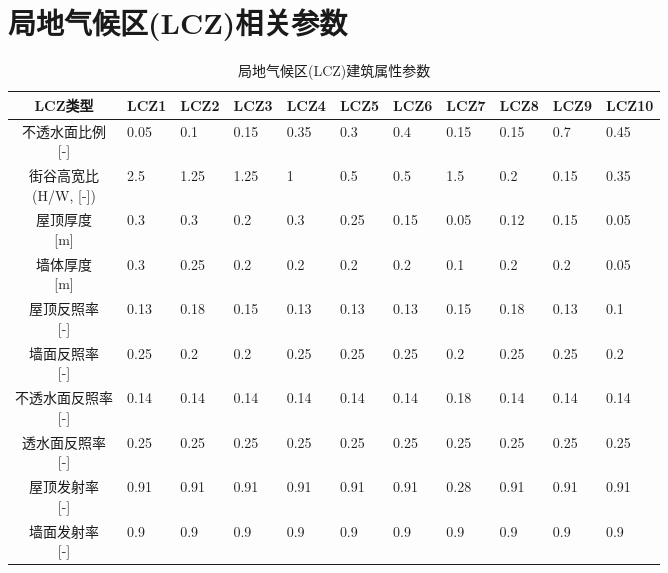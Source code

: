 \chapter{局地气候区(LCZ)相关参数}\label{局地气候区(LCZ)建筑属性参数}
\begin{landscape}
\begin{table}[htbp]
    \footnotesize
	\centering
	\caption{局地气候区(LCZ)建筑属性参数}
	\label{tab:lcz局地气候区建筑属性参数}
    \begin{tabular}{@{}cllllllllll@{}}
    \toprule
    LCZ类型       & LCZ1 & LCZ2 & LCZ3 & LCZ4 & LCZ5 & LCZ6 & LCZ7 & LCZ8 & LCZ9 & LCZ10 \\ \midrule
    \makecell{不透水面比例\\{[-]}}   & 0.05 & 0.1  & 0.15 & 0.35 & 0.3  & 0.4  & 0.15 & 0.15 & 0.7  & 0.45 \\
    \makecell{街谷高宽比\\(H/W, [-])}& 2.5  & 1.25 & 1.25 & 1    & 0.5  & 0.5  & 1.5  & 0.2  & 0.15 & 0.35 \\
    \makecell{屋顶厚度\\{[m]}}      & 0.3  & 0.3  & 0.2  & 0.3  & 0.25 & 0.15 & 0.05 & 0.12 & 0.15 & 0.05 \\
    \makecell{墙体厚度\\{[m]}}     & 0.3  & 0.25 & 0.2  & 0.2  & 0.2  & 0.2  & 0.1  & 0.2  & 0.2  & 0.05 \\
    \makecell{屋顶反照率\\{[-]}}    & 0.13 & 0.18 & 0.15 & 0.13 & 0.13 & 0.13 & 0.15 & 0.18 & 0.13 & 0.1  \\
    \makecell{墙面反照率\\{[-]}}    & 0.25 & 0.2  & 0.2  & 0.25 & 0.25 & 0.25 & 0.2  & 0.25 & 0.25 & 0.2  \\
    \makecell{不透水面反照率\\{[-]}}& 0.14 & 0.14 & 0.14 & 0.14 & 0.14 & 0.14 & 0.18 & 0.14 & 0.14 & 0.14 \\
    \makecell{透水面反照率\\{[-]}}& 0.25 & 0.25 & 0.25 & 0.25 & 0.25 & 0.25 & 0.25 & 0.25 & 0.25 & 0.25 \\
    \makecell{屋顶发射率\\{[-]}}  & 0.91 & 0.91 & 0.91 & 0.91 & 0.91 & 0.91 & 0.28 & 0.91 & 0.91 & 0.91 \\
    \makecell{墙面发射率\\{[-]}}  & 0.9  & 0.9  & 0.9  & 0.9  & 0.9  & 0.9  & 0.9  & 0.9  & 0.9  & 0.9  \\

\end{tabular}
\end{table}
\end{landscape}
